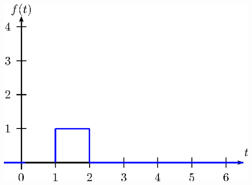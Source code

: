 \begin{resp}
\begin{itemize}
\begin{center}
\includegraphics{cap_trans_int/pics/figura_19}\end{center}
\end{itemize}
\end{resp}


